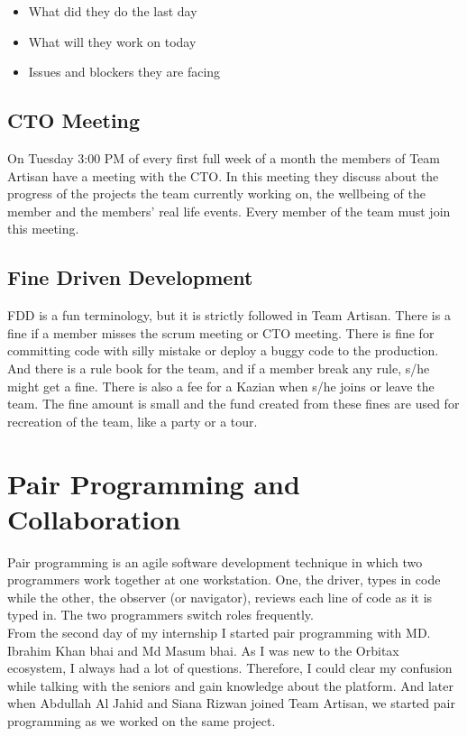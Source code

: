 \begin{itemize}
    \item What did they do the last day
    \item What will they work on today
    \item Issues and blockers they are facing
\end{itemize}

\subsection{CTO Meeting}

On Tuesday 3:00 PM of every first full week of a month the members of Team Artisan have a meeting with the CTO.
In this meeting they discuss about the progress of the projects the team currently working on, the wellbeing of the member and the members' real life events.
Every member of the team must join this meeting.

\subsection{Fine Driven Development}

FDD is a fun terminology, but it is strictly followed in Team Artisan.
There is a fine if a member misses the scrum meeting or CTO meeting.
There is fine for committing code with silly mistake or deploy a buggy code to the production.
And there is a rule book for the team, and if a member break any rule, s/he might get a fine.
There is also a fee for a Kazian when s/he joins or leave the team.
The fine amount is small and the fund created from these fines are used for recreation of the team, like a party or a tour.

\section{Pair Programming and Collaboration}

Pair programming is an agile software development technique in which two programmers work together at one workstation. One, the driver, types in code
while the other, the observer (or navigator), reviews each line of code as it is typed in. The two programmers switch roles frequently.\\

From the second day of my internship I started pair programming with MD. Ibrahim Khan bhai and Md Masum bhai.
As I was new to the Orbitax ecosystem, I always had a lot of questions.
Therefore, I could clear my confusion while talking with the seniors and gain knowledge about the platform.
And later when Abdullah Al Jahid and Siana Rizwan joined Team Artisan, we started pair programming as we worked on the same project.\\

